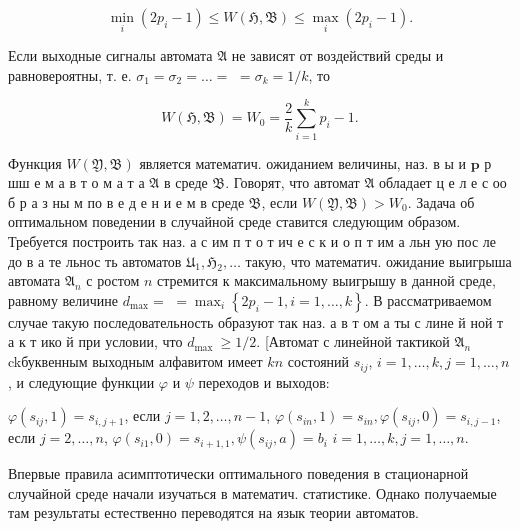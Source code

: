\documentclass[10pt]{article}
\begin{document}
\[

\min _{i}\left(2 p_{i}-1\right) \leqslant W(\mathfrak{H}, \mathfrak{B}) \leqslant \max _{i}\left(2 p_{i}-1\right) .

\]



Если выходные сигналы автомата $\mathfrak{A}$ не зависят от воздействий среды и равновероятны, т. е. $\sigma_{1}=\sigma_{2}=\ldots=$ $=\sigma_{k}=1 / k$, то



\[

W(\mathfrak{H}, \mathfrak{B})=W_{0}=\frac{2}{k} \sum_{i=1}^{k} p_{i}-1 .

\]



Функция $W(\mathfrak{Y}, \mathfrak{B})$ является математич. ожиданием величины, наз. в ы и $\mathbf{p}$ р шш е м а в т о м а т а $\mathfrak{A}$ в среде $\mathfrak{B}$. Говорят, что автомат $\mathfrak{A}$ обладает ц е л е с оо б р а з ны м по в е д е н и е м в среде $\mathfrak{B}$, если $W(\mathfrak{Y}, \mathfrak{B})>W_{0}$. Задача об оптимальном поведении в случайной среде ставится следующим образом. Требуется построить так наз. а с им п т о т ич е с к и о п т им а льн ую пос ле до в а те льнос ть автоматов $\mathfrak{U}_{1}, \mathfrak{H}_{2}, \ldots$ такую, что математич. ожидание выигрыша автомата $\mathfrak{A}_{n}$ с ростом $n$ стремится к максимальному выигрышу в данной среде, равному величине $d_{\max }=$ $=\max _{i}\left\{2 p_{i}-1, i=1, \ldots, k\right\}$. В рассматриваемом случае такую последовательность образуют так наз. а в т ом а ты с лине й ной т а к т ико й при условии, что $d_{\text {max }} \geqslant 1 / 2$. [Автомат с линейной тактикой $\mathfrak{A}_{n}$ ckбуквенным выходным алфавитом имеет $k n$ состояний $s_{i j}$, $i=1, \ldots, k, j=1, \ldots, n$, и следующие функции $\varphi$ и $\psi$ переходов и выходов:



$\varphi\left(s_{i j}, 1\right)=s_{i, j+1}$, если $j=1,2, \ldots, n-1$, $\varphi\left(s_{i n}, 1\right)=s_{i n}, \varphi\left(s_{i j}, 0\right)=s_{i, j-1}$, если $j=2, \ldots, n$, $\varphi\left(s_{i 1}, 0\right)=s_{i+1,1}, \psi\left(s_{i j}, a\right)=b_{i}$ $i=1, \ldots, k, j=1, \ldots, n$.



Впервые правила асимптотически оптимального поведения в стационарной случайной среде начали изучаться в математич. статистике. Однако получаемые там результаты естественно переводятся на язык теории автоматов.
\end{document}
